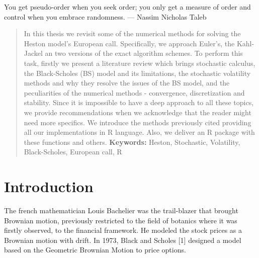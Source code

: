 \documentclass[12pt,twoside]{reedthesis}
\theoremstyle{definition}
\theoremstyle{definition}
\theoremstyle{remark}
\begin{document}
\begin{acknowledgements}
      You get pseudo-order when you seek order; you only get a measure of
      order and control when you embrace randomness. --- Nassim Nicholas Taleb
    \end{acknowledgements}
  
      \hypersetup{linkcolor=black}
    \setcounter{tocdepth}{2}
    \tableofcontents
  
      \listoftables
  
      \listoffigures
      \begin{abstract}
      In this thesis we revisit some of the numerical methods for solving the
      Heston model's European call. Specifically, we approach Euler's, the
      Kahl-Jackel an two versions of the exact algorithm schemes. To perform
      this task, firstly we present a literature review which brings
      stochastic calculus, the Black-Scholes (BS) model and its limitations,
      the stochastic volatility methods and why they resolve the issues of the
      BS model, and the peculiarities of the numerical methods - convergence,
      discretization and stability. Since it is impossible to have a deep
      approach to all these topics, we provide recommendations when we
      acknowledge that the reader might need more specifics. We introduce the
      methods previously cited providing all our implementations in R
      language. Also, we deliver an R package with these functions and others.
      \newline \newline \textbf{Keywords:} Heston, Stochastic, Volatility,
      Black-Scholes, European call, R
    \end{abstract}
  
  \mainmatter %
  \pagestyle{fancyplain} %

  \newcommand{\source}[1]{\caption*{Source: {#1}} }
  
  
  
  \chapter{Introduction}\label{intro}
  
  The french mathematician Louis Bachelier was the trail-blazer that
  brought Brownian motion, previously restricted to the field of botanics
  where it was firstly observed, to the financial framework. He modeled
  the stock prices as a Brownian motion with drift. In 1973, Black and
  Scholes {[}1{]} designed a model based on the Geometric Brownian Motion
  to price options.
  
\end{document}
